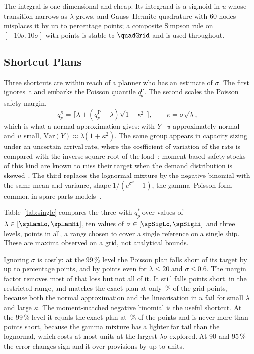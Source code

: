 The integral is one-dimensional and cheap. Its integrand is a sigmoid in $u$
whose transition narrows as $\lambda$ grows, and Gauss--Hermite quadrature with
60 nodes misplaces it by up to \quadGH{} percentage points; a composite Simpson
rule on $[-10\sigma,10\sigma]$ with \quadNodes{} points is stable to
$\quadGrid$ and is used throughout.

\subsection{Shortcut Plans}
Three shortcuts are within reach of a planner who has an estimate of $\sigma$.
The first ignores it and embarks the Poisson quantile $q^{\mathrm P}_p$. The
second scales the Poisson safety margin,
\begin{equation}
q^{\kappa}_p=\big\lceil\lambda+(q^{\mathrm P}_p-\lambda)\sqrt{1+\kappa^2}\,\big\rceil,
\qquad \kappa=\sigma\sqrt\lambda ,
\label{eq:kappa}
\end{equation}
which is what a normal approximation gives: with $Y\mid u$ approximately normal
and $u$ small, $\mathrm{Var}(Y)\approx\lambda(1+\kappa^2)$. The same group
appears in capacity sizing under an uncertain arrival rate, where the
coefficient of variation of the rate is compared with the inverse square root
of the load~\cite{bassamboo2010,mathijsen2018}; moment-based safety stocks of
this kind are known to miss their target when the demand distribution is
skewed~\cite{eppen1988}. The third replaces the lognormal mixture by the
negative binomial with the same mean and variance, shape
$1/(e^{\sigma^2}-1)$, the gamma--Poisson form common in spare-parts
models~\cite{aronis2004,sherbrooke2004}.

Table~\ref{tab:single} compares the three with $q^\ast_p$ over
\spLamN{} values of $\lambda\in[\spLamLo,\spLamHi]$, ten values of
$\sigma\in[\spSigLo,\spSigHi]$ and three levels, \spPts{} points in all, a
range chosen to cover a single reference on a single ship. These are maxima
observed on a grid, not analytical bounds.

Ignoring $\sigma$ is costly: at the 99\,\% level the Poisson plan falls short
of its target by up to \spPoisShort{} percentage points, and by
\spPoisShortOp{} points even for $\lambda\le 20$ and $\sigma\le0.6$. The
margin factor removes most of that loss but not all of it. It still falls
\spKapShort{} points short, \spKapShortOp{} in the restricted range, and
matches the exact plan at only \spKapEqual\,\% of the grid points, because
both the normal approximation and the linearisation in $u$ fail for small
$\lambda$ and large $\kappa$. The moment-matched negative binomial is the
useful shortcut. At the 99\,\% level it equals the exact plan at
\spNbEqual\,\% of the points and is never more than \spNbShort{} points short,
because the gamma mixture has a lighter far tail than the lognormal, which
costs at most \spNbUnits{} units at the largest $\lambda\sigma$ explored. At 90
and 95\,\% the error changes sign and it over-provisions by up to
\spNbOver{} units.

